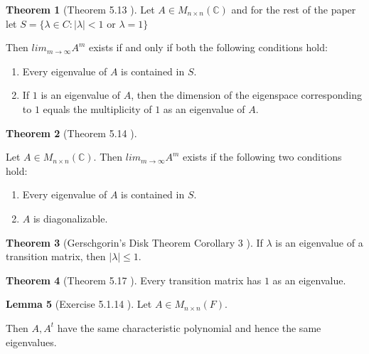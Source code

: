 \documentclass{amsart}
\theoremstyle{definition}
\newtheorem{theorem}{Theorem}
\newtheorem{lemma}[theorem]{Lemma}
\theoremstyle{remark}
\numberwithin{equation}{section}
\begin{document}
\begin{theorem}[Theorem 5.13 \cite{friedberg2003linear}]\label{theorem513}
Let $A \in M_{n \times n}(\mathbb{C})$ and for the rest of the paper let $S = \{ \lambda \in C: |\lambda| < 1$ or $\lambda = 1\}$

Then $lim_{m \to \infty}A^m$ exists if and only if both the following conditions hold:

\begin{enumerate}
	\item Every eigenvalue of $A$ is contained in $S$.
	\item If $1$ is an eigenvalue of $A$, then the dimension of the eigenspace corresponding to $1$ equals the multiplicity of $1$ as an eigenvalue of $A$.

\end{enumerate}

\end{theorem}

\begin{theorem}[Theorem 5.14 \cite{friedberg2003linear}]\label{theorem514}

Let $A \in M_{n \times n}(\mathbb{C})$.
Then $lim_{m \to \infty}A^m$ exists if the following two conditions hold:

\begin{enumerate}
	\item Every eigenvalue of $A$ is contained in $S$.
	\item $A$ is diagonalizable.

\end{enumerate}

\end{theorem}


\begin{theorem}[Gerschgorin's Disk Theorem Corollary 3 \cite{friedberg2003linear}]\label{theorem516}
If $\lambda$ is an eigenvalue of a transition matrix, then $|\lambda| \leq 1$.

\end{theorem}

\begin{theorem}[Theorem 5.17 \cite{friedberg2003linear}]\label{theorem517}
Every transition matrix has $1$ as an eigenvalue.

\end{theorem}

\begin{lemma}[Exercise 5.1.14 \cite{friedberg2003linear}]\label{exercise5114}
Let $A \in M_{n \times n}(F)$.

Then $A, A^t$ have the same characteristic polynomial and hence the same eigenvalues.
\end{lemma}
\end{document}
